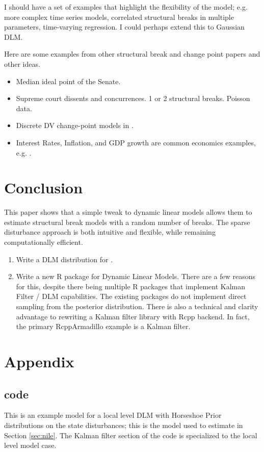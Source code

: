 \documentclass{article}
\begin{document}
I should have a set of examples that highlight the flexibility of the model; e.g. more complex time series models, correlated structural breaks in multiple parameters, time-varying regression. 
I could perhaps extend this to Gaussian DLM.

Here are some examples from other structural break and change point papers and other ideas.

\begin{itemize}
\item Median ideal point of the Senate. \parencites{RatkovicEng2010}
\item Supreme court dissents and concurrences. 1 or 2 structural breaks. Poisson data. \parencite{CalderiaZorn1998}
\item Discrete DV change-point models in \parencite{Spirling2007b}.
\item Interest Rates, Inflation, and GDP growth are common economics examples, e.g. \textcite{GiordaniKohn2008}.
\end{itemize}

\section{Conclusion}
\label{sec:conclusion}

This paper shows that a simple tweak to dynamic linear models allows them to estimate structural break models with a random number of breaks.
The sparse disturbance approach is both intuitive and flexible, while remaining computationally efficient.

\begin{enumerate}
\item Write a DLM distribution for \Stan{}.
\item Write a new R package for Dynamic Linear Models. There are a few reasons for this, despite there being multiple R packages that implement Kalman Filter / DLM capabilities. 
The existing packages do not implement direct sampling from the posterior distribution. 
There is also a technical and clarity advantage to rewriting a Kalman filter library with Rcpp backend. In fact, the primary RcppArmadillo example is 
a Kalman filter.
\end{enumerate}

\clearpage{}

\printbibliography{}

\section{Appendix}
\label{sec:appendix
}
\subsection{code}
\label{sec:code}

This is an example \Stan{} model for a local level DLM with Horseshoe Prior distributions on the state disturbances; this is the \Stan{} model used to estimate  in Section \ref{sec:nile}. 
The Kalman filter section of the \Stan{} code is specialized to the local level model case.

\begin{singlespace}
    
\end{singlespace}
\end{document}
